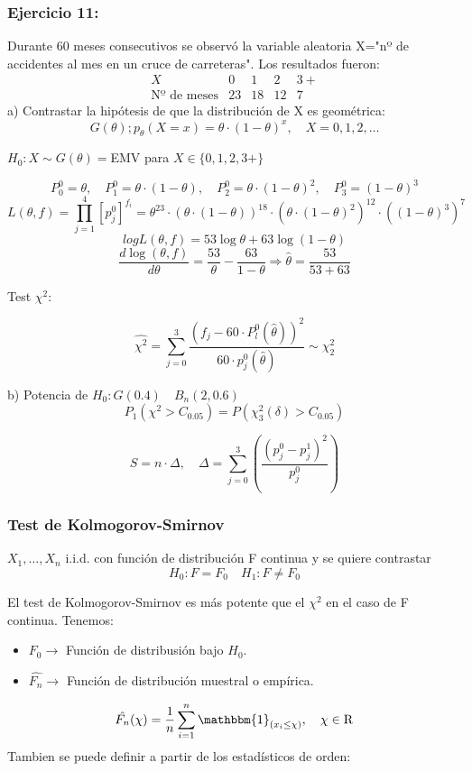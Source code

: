 \newpage
\subsubsection*{Ejercicio 11:}  
Durante 60 meses consecutivos se observó la variable aleatoria X="nº de accidentes al mes en un cruce de carreteras". Los resultados fueron:
\[
\begin{matrix}
    X & 0 & 1&2& 3+ \\
    \text{Nº de meses} & 23 & 18 & 12 & 7
\end{matrix}
\]
a) Contrastar la hipótesis de que la distribución de X es geométrica: 
\[
G(\theta);p_\theta(X=x)=\theta \cdot (1- \theta)^x, \quad X=0,1,2,\dots
\]

$H_0: X \sim G(\theta)=$EMV para $X \in \{0,1,2,3+\}$

\[
P_0^0=\theta, \quad P_1^0=\theta \cdot (1-\theta), \quad P_2^0=\theta \cdot (1-\theta)^2, \quad P_3^0=(1-\theta)^3
\]
\[
L(\theta,f)=\prod_{j=1}^{4}[p_j^0]^{f_i}= \theta^{23}\cdot(\theta \cdot (1-\theta))^18 \cdot (\theta \cdot (1-\theta)^2)^12 \cdot ((1-\theta)^3)^7
\]
\[
log L(\theta,f)=53 \log \theta+63 \log (1-\theta)
\]
\[
\frac{d \log(\theta,f)}{d \theta}=\frac{53}{\theta}-\frac{63}{1-\theta} \Longrightarrow \hat{\theta}=\frac{53}{53+63}
\]

Test $\chi^2$:

\[
\hat{\chi^2}=\sum_{j=0}^{3} \frac{(f_j-60\cdot P_l^0(\hat{\theta}))^2}{60 \cdot p_j^0(\hat{\theta})} \sim \chi^2_2
\]

b) Potencia de $H_0:G(0.4) \quad B_n(2,0.6)$
\[
P_1(\chi^2> C_{0.05})=P(\chi_3^2(\delta)>C_{0.05})
\]

\[
S=n \cdot \Delta, \quad \Delta=\sum_{j=0}^{3} \left(\frac{(p_j^0-p_j^1)^2}{p_j^0}\right)
\]

\subsubsection{Test de Kolmogorov-Smirnov}

$X_1,\dots, X_n$ i.i.d. con función de distribución F continua y se quiere contrastar
\[
H_0: F=F_0 \quad H_1: F \neq F_0
\]

El test de Kolmogorov-Smirnov es más potente que el $\chi^2$ en el caso de F continua.
Tenemos:
\begin{itemize}
    \item $F_0 \to $ Función de distribusión bajo $H_0$.
    \item $\hat{F_n} \to$ Función de distribución muestral o empírica.
\end{itemize}
\[
\hat{F_n}(\chi)=\frac{1}{n} \sum_{i=1}^{n} \mathbbm{1}_{(x_i \leq \chi)}, \quad \chi \in \mathrm{R}
\]
\newpage
Tambien se puede definir a partir de los estadísticos de orden:

